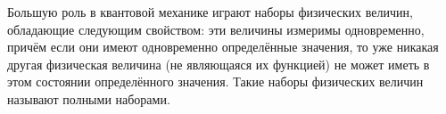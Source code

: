 
Большую роль в квантовой механике играют наборы физических величин, обладающие
следующим свойством: эти величины измеримы одновременно, причём если они имеют
одновременно определённые значения, то уже никакая другая физическая величина
(не являющаяся их функцией) не может иметь в этом состоянии определённого
значения. Такие наборы физических величин называют полными наборами.

